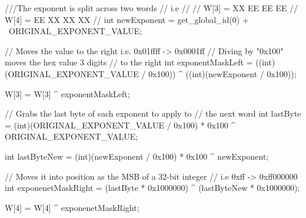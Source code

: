 \begin{adjustbox}{width=\textwidth,height=15cm,keepaspectratio}
\begin{OpenCLCode}
///The exponent is split across two words
// i.e
//
// W[3] = XX EE EE EE
// W[4] = EE XX XX XX
//
int newExponent = get_global_id(0) + \
                    ORIGINAL_EXPONENT_VALUE;

// Moves the value to the right i.e. 0x01ffff -> 0x0001ff
// Diving by "0x100" moves the hex value 3 digits
// to the right
int exponentMaskLeft = ((int)(ORIGINAL_EXPONENT_VALUE / 0x100)) ^ ((int)(newExponent / 0x100));

W[3] = W[3] ^ exponentMaskLeft;

// Grabs the last byte of each exponent to apply to 
// the next word
int lastByte = (int)(ORIGINAL_EXPONENT_VALUE / 0x100) *
    0x100 ^ ORIGINAL_EXPONENT_VALUE;

int lastByteNew = (int)(newExponent / 0x100) * 0x100 ^ newExponent;

// Moves it into position as the MSB of a 32-bit integer 
// i.e 0xff -> 0xff000000
int exponenetMaskRight = (lastByte * 0x1000000) ^ 
    (lastByteNew * 0x1000000);

W[4] = W[4] ^ exponenetMaskRight;
\end{OpenCLCode}
\end{adjustbox}